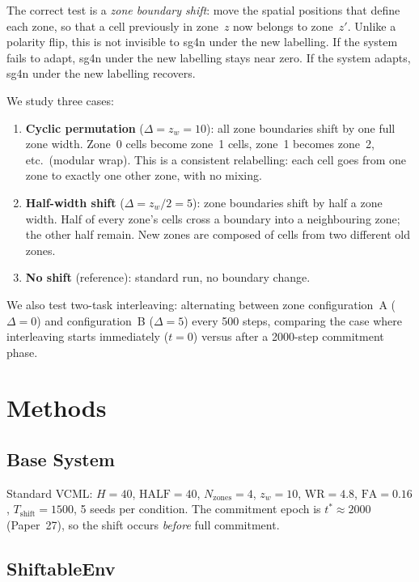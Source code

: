 \documentclass[11pt]{article}
\begin{document}
The correct test is a \emph{zone boundary shift}: move the spatial positions that define
each zone, so that a cell previously in zone~$z$ now belongs to zone~$z'$.
Unlike a polarity flip, this is not invisible to sg4n under the new labelling.
If the system fails to adapt, sg4n under the new labelling stays near zero.
If the system adapts, sg4n under the new labelling recovers.

We study three cases:
\begin{enumerate}
  \item \textbf{Cyclic permutation} ($\Delta = z_w = 10$): all zone boundaries shift by
        one full zone width.  Zone~0 cells become zone~1 cells, zone~1 becomes zone~2,
        etc.\ (modular wrap).  This is a consistent relabelling: each cell goes from
        one zone to exactly one other zone, with no mixing.
  \item \textbf{Half-width shift} ($\Delta = z_w/2 = 5$): zone boundaries shift by half
        a zone width.  Half of every zone's cells cross a boundary into a neighbouring
        zone; the other half remain.  New zones are composed of cells from two different
        old zones.
  \item \textbf{No shift} (reference): standard run, no boundary change.
\end{enumerate}

We also test two-task interleaving: alternating between zone configuration~A
($\Delta = 0$) and configuration~B ($\Delta = 5$) every 500 steps,
comparing the case where interleaving starts immediately ($t=0$) versus after a
2000-step commitment phase.

\section{Methods}

\subsection{Base System}

Standard VCML: $H=40$, $\mathrm{HALF}=40$, $N_\mathrm{zones}=4$, $z_w=10$,
$\mathrm{WR}=4.8$, $\mathrm{FA}=0.16$, $T_\mathrm{shift}=1500$, 5 seeds per condition.
The commitment epoch is $t^* \approx 2000$ (Paper~27), so the shift occurs \emph{before}
full commitment.

\subsection{ShiftableEnv}
\end{document}
